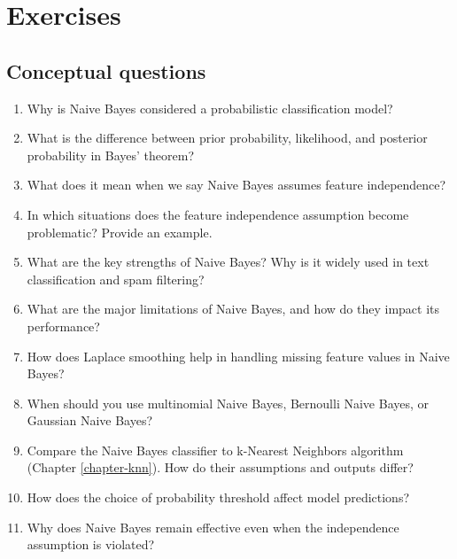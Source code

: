 \documentclass[
]{book}
\providecommand{\tightlist}{%
  \setlength{\itemsep}{0pt}\setlength{\parskip}{0pt}}
\theoremstyle{definition}
\theoremstyle{definition}
\theoremstyle{definition}
\theoremstyle{definition}
\theoremstyle{remark}
\begin{document}
\section{Exercises}\label{exercises-7}

\subsection*{Conceptual questions}\label{conceptual-questions-5}

\begin{enumerate}
\def\labelenumi{\arabic{enumi}.}
\tightlist
\item
  Why is Naive Bayes considered a probabilistic classification model?\\
\item
  What is the difference between prior probability, likelihood, and posterior probability in Bayes' theorem?\\
\item
  What does it mean when we say Naive Bayes assumes feature independence?\\
\item
  In which situations does the feature independence assumption become problematic? Provide an example.\\
\item
  What are the key strengths of Naive Bayes? Why is it widely used in text classification and spam filtering?\\
\item
  What are the major limitations of Naive Bayes, and how do they impact its performance?\\
\item
  How does Laplace smoothing help in handling missing feature values in Naive Bayes?\\
\item
  When should you use multinomial Naive Bayes, Bernoulli Naive Bayes, or Gaussian Naive Bayes?\\
\item
  Compare the Naive Bayes classifier to k-Nearest Neighbors algorithm (Chapter \ref{chapter-knn}). How do their assumptions and outputs differ?\\
\item
  How does the choice of probability threshold affect model predictions?\\
\item
  Why does Naive Bayes remain effective even when the independence assumption is violated?\\

\end{enumerate}
\end{document}
